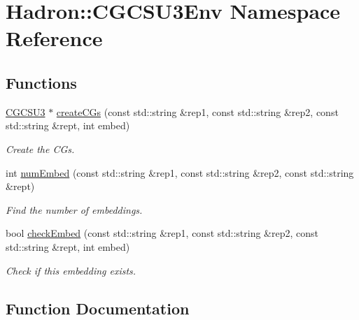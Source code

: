 \hypertarget{namespaceHadron_1_1CGCSU3Env}{}\section{Hadron\+:\+:C\+G\+C\+S\+U3\+Env Namespace Reference}
\label{namespaceHadron_1_1CGCSU3Env}
\subsection*{Functions}
\begin{DoxyCompactItemize}
\item 
\mbox{\hyperlink{classHadron_1_1CGCSU3}{C\+G\+C\+S\+U3}} $\ast$ \mbox{\hyperlink{namespaceHadron_1_1CGCSU3Env_aa351bf5350216c70336911a96182d035}{create\+C\+Gs}} (const std\+::string \&rep1, const std\+::string \&rep2, const std\+::string \&rept, int embed)
\begin{DoxyCompactList}\small\item\em Create the C\+Gs. \end{DoxyCompactList}\item 
int \mbox{\hyperlink{namespaceHadron_1_1CGCSU3Env_acc35e8f63cd5a1ffe14a963df3f2c1fd}{num\+Embed}} (const std\+::string \&rep1, const std\+::string \&rep2, const std\+::string \&rept)
\begin{DoxyCompactList}\small\item\em Find the number of embeddings. \end{DoxyCompactList}\item 
bool \mbox{\hyperlink{namespaceHadron_1_1CGCSU3Env_a27b5d0906a9a8d201a8479db853e5ca5}{check\+Embed}} (const std\+::string \&rep1, const std\+::string \&rep2, const std\+::string \&rept, int embed)
\begin{DoxyCompactList}\small\item\em Check if this embedding exists. \end{DoxyCompactList}\end{DoxyCompactItemize}


\subsection{Function Documentation}
\mbox{\label{namespaceHadron_1_1CGCSU3Env_a27b5d0906a9a8d201a8479db853e5ca5}} 
